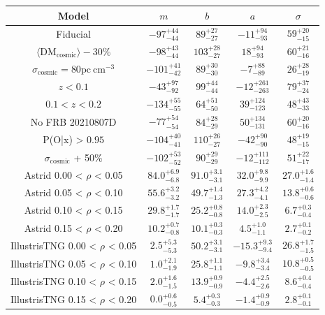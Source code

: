 \begin{table}[htbp]
\centering
\begin{tabular}{|c|c|c|c|c|}
\hline
Model & $m$ & $b$ & $a$ & $\sigma$ \\
\hline
Fiducial & $-97^{+44}_{-44}$ & $89^{+27}_{-27}$ & $-11^{+94}_{-93}$ & $59^{+20}_{-15}$ \\
$\langle \mathrm{DM}_\mathrm{cosmic}\rangle - 30\%$ & $-98^{+43}_{-44}$ & $103^{+28}_{-27}$ & $18^{+94}_{-93}$ & $60^{+21}_{-16}$ \\
$\sigma_\mathrm{cosmic} = 80 \mathrm{pc~cm}^{-3}$ & $-101^{+41}_{-42}$ & $89^{+30}_{-30}$ & $-7^{+88}_{-89}$ & $26^{+28}_{-19}$ \\
$z < 0.1$ & $-43^{+97}_{-92}$ & $99^{+44}_{-44}$ & $-12^{+261}_{-263}$ & $79^{+37}_{-24}$ \\
$0.1 < z < 0.2$ & $-134^{+55}_{-55}$ & $64^{+51}_{-50}$ & $39^{+124}_{-123}$ & $48^{+43}_{-33}$ \\
No FRB 20210807D & $-77^{+54}_{-54}$ & $84^{+28}_{-29}$ & $50^{+134}_{-131}$ & $60^{+20}_{-16}$ \\
P(O|x) > $0.95$ & $-104^{+40}_{-41}$ & $110^{+26}_{-27}$ & $-42^{+90}_{-90}$ & $48^{+19}_{-15}$ \\
$\sigma_\mathrm{cosmic}$ + 50\% & $-102^{+53}_{-52}$ & $90^{+29}_{-29}$ & $-12^{+111}_{-112}$ & $51^{+22}_{-17}$ \\
\hline
Astrid 0.00 < $\rho$ < 0.05 & $84.0^{+6.9}_{-6.8}$ & $91.0^{+3.1}_{-3.1}$ & $32.0^{+9.8}_{-9.9}$ & $27.0^{+1.6}_{-1.4}$ \\
Astrid 0.05 < $\rho$ < 0.10 & $55.6^{+3.2}_{-3.2}$ & $49.7^{+1.4}_{-1.3}$ & $27.3^{+4.2}_{-4.1}$ & $13.8^{+0.6}_{-0.6}$ \\
Astrid 0.10 < $\rho$ < 0.15 & $29.8^{+1.7}_{-1.7}$ & $25.2^{+0.8}_{-0.8}$ & $14.0^{+2.3}_{-2.5}$ & $6.7^{+0.3}_{-0.4}$ \\
Astrid 0.15 < $\rho$ < 0.20 & $10.2^{+0.7}_{-0.8}$ & $10.1^{+0.3}_{-0.3}$ & $4.5^{+1.0}_{-1.1}$ & $2.7^{+0.1}_{-0.2}$ \\
IllustrisTNG 0.00 < $\rho$ < 0.05 & $2.5^{+5.3}_{-5.3}$ & $50.2^{+3.1}_{-3.1}$ & $-15.3^{+9.3}_{-9.4}$ & $26.8^{+1.7}_{-1.5}$ \\
IllustrisTNG 0.05 < $\rho$ < 0.10 & $1.0^{+2.1}_{-1.9}$ & $25.8^{+1.1}_{-1.1}$ & $-9.8^{+3.4}_{-3.4}$ & $10.8^{+0.5}_{-0.5}$ \\
IllustrisTNG 0.10 < $\rho$ < 0.15 & $2.0^{+1.6}_{-1.5}$ & $13.9^{+0.9}_{-0.9}$ & $-4.4^{+2.5}_{-2.6}$ & $8.6^{+0.4}_{-0.4}$ \\
IllustrisTNG 0.15 < $\rho$ < 0.20 & $0.0^{+0.6}_{-0.5}$ & $5.4^{+0.3}_{-0.3}$ & $-1.4^{+0.9}_{-0.9}$ & $2.8^{+0.1}_{-0.1}$ \\

\end{tabular}
\end{table}
